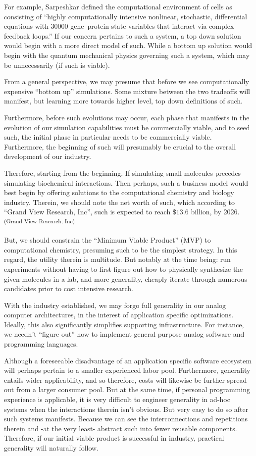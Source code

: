 For example, Sarpeshkar defined the computational environment of cells as consisting of ``highly computationally intensive nonlinear, stochastic, differential equations with $30000$ gene–protein state variables that interact via complex feedback loops.'' If our concern pertains to such a system, a top down solution would begin with a more direct model of such. While a bottom up solution would begin with the quantum mechanical physics governing such a system, which may be unnecessarily (if such is viable).

From a general perspective, we may presume that before we see computationally expensive ``bottom up'' simulations. Some mixture between the two tradeoffs will manifest, but learning more towards higher level, top down definitions of such.

Furthermore, before such evolutions may occur, each phase that manifests in the evolution of our simulation capabilities must be commercially viable, and to seed such, the initial phase in particular needs to be commercially viable. Furthermore, the beginning of such will presumably be crucial to the overall development of our industry.

Therefore, starting from the beginning. If simulating small molecules precedes simulating biochemical interactions. Then perhaps, such a business model would best begin by offering solutions to the computational chemistry and biology industry. Therein, we should note the net worth of such, which according to ``Grand View Research, Inc'', such is expected to reach $\$13.6$ billion, by 2026.\textsuperscript{(Grand View Research, Inc)}

But, we should constrain the ``Minimum Viable Product'' (MVP) to computational chemistry, presuming such to be the simplest strategy. In this regard, the utility therein is multitude. But notably at the time being: run experiments without having to first figure out how to physically synthesize the given molecules in a lab, and more generality, cheaply iterate through numerous candidates prior to cost intensive research. 

With the industry established, we may forgo full generality in our analog computer architectures, in the interest of application specific optimizations. Ideally, this also significantly simplifies supporting infrastructure. For instance, we needn't ``figure out'' how to implement general purpose analog software and programming languages.

Although a foreseeable disadvantage of an application specific software ecosystem will perhaps pertain to a smaller experienced labor pool. Furthermore, generality entails wider applicability, and so therefore, costs will likewise be further spread out from a larger consumer pool. But at the same time, if personal programming experience is applicable, it is very difficult to engineer generality in ad-hoc systems when the interactions therein isn't obvious. But very easy to do so after such systems manifests. Because we can see the interconnections and repetitions therein and -at the very least- abstract such into fewer reusable components. Therefore, if our initial viable product is successful in industry, practical generality will naturally follow.

